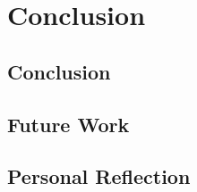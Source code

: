 \chapter{Conclusion}
\label{chapter8}

\section{Conclusion}
\lipsum[1-1] \cite{parikh1980adaptive}

\section{Future Work}
\lipsum[1-1] \cite{parikh1980adaptive}

\section{Personal Reflection}
\lipsum[1-1] \cite{parikh1980adaptive}